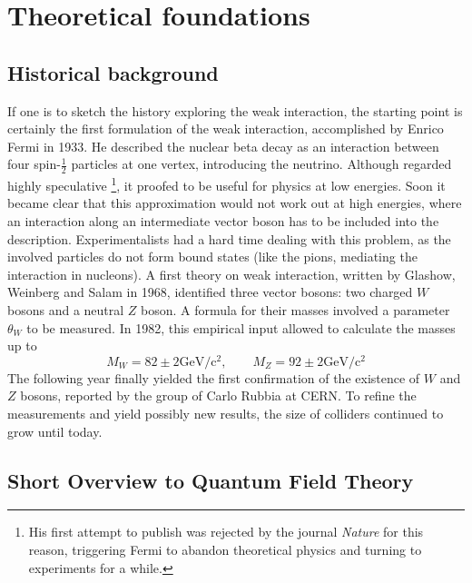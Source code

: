 \section{Theoretical foundations}
\subsection{Historical background}
If one is to sketch the history exploring the weak interaction, 
the starting point is certainly the first formulation of the 
weak interaction, accomplished by Enrico Fermi in 1933. 
He described the nuclear beta decay as an interaction 
between four spin-$\frac{1}{2}$ particles at one vertex, 
introducing the neutrino. Although regarded highly speculative%
\footnote{His first attempt to publish was rejected by the journal
\emph{Nature} for this reason, triggering Fermi to abandon 
theoretical physics and turning to experiments for a while.}, 
it proofed to be useful for physics at low energies. 
Soon it became clear that this approximation would not work out 
at high energies, where an interaction along an intermediate 
vector boson has to be included into the description. 
Experimentalists had a hard time dealing with this problem, 
as the involved particles do not form bound states (like the 
pions, mediating the interaction in nucleons). A first theory
on weak interaction, written by Glashow, Weinberg and Salam 
in 1968, identified three vector bosons: two charged $W$ bosons 
and a neutral $Z$ boson. A formula for their masses involved a 
parameter $\theta_W$ to be measured. In 1982, this empirical 
input allowed to calculate the masses up to
\begin{equation}
    M_W = 82 \pm 2 \mathrm{GeV / c^2},\qquad 
    M_Z = 92 \pm 2 \mathrm{GeV / c^2}
\end{equation}
The following year finally yielded the first confirmation 
of the existence of $W$ and $Z$ bosons, reported by the group 
of Carlo Rubbia at CERN. To refine the measurements and yield 
possibly new results, the size of colliders continued to grow until today. 

\subsection{Short Overview to Quantum Field Theory}
\label{sub:qft}

